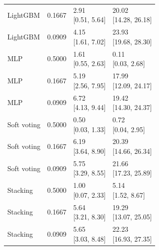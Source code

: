 \begin{longtable}{llll}
LightGBM & 0.1667 & \shortstack{{2.91} \\ {[0.51, 5.64]}} & \shortstack{{20.02} \\ {[14.28, 26.18]}} \\
LightGBM & 0.0909 & \shortstack{{4.15} \\ {[1.61, 7.02]}} & \shortstack{{23.93} \\ {[19.68, 28.30]}} \\
MLP & 0.5000 & \shortstack{{1.61} \\ {[0.55, 2.63]}} & \shortstack{{0.11} \\ {[0.03, 2.68]}} \\
MLP & 0.1667 & \shortstack{{5.19} \\ {[2.56, 7.95]}} & \shortstack{{17.99} \\ {[12.09, 24.17]}} \\
MLP & 0.0909 & \shortstack{{6.72} \\ {[4.13, 9.44]}} & \shortstack{{19.42} \\ {[14.30, 24.37]}} \\
Soft voting & 0.5000 & \shortstack{{0.50} \\ {[0.03, 1.33]}} & \shortstack{{0.72} \\ {[0.04, 2.95]}} \\
Soft voting & 0.1667 & \shortstack{{6.19} \\ {[3.64, 8.90]}} & \shortstack{{20.39} \\ {[14.66, 26.34]}} \\
Soft voting & 0.0909 & \shortstack{{5.75} \\ {[3.29, 8.55]}} & \shortstack{{21.66} \\ {[17.23, 25.89]}} \\
Stacking & 0.5000 & \shortstack{{1.00} \\ {[0.07, 2.33]}} & \shortstack{{5.14} \\ {[1.52, 8.67]}} \\
Stacking & 0.1667 & \shortstack{{5.64} \\ {[3.21, 8.30]}} & \shortstack{{19.29} \\ {[13.07, 25.05]}} \\
Stacking & 0.0909 & \shortstack{{5.65} \\ {[3.03, 8.48]}} & \shortstack{{22.23} \\ {[16.93, 27.35]}} \\
\bottomrule
\end{longtable}
\endgroup
